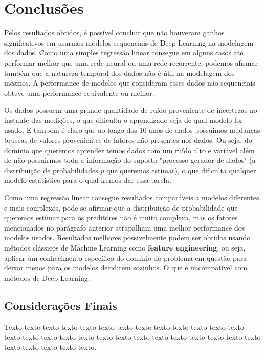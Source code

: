 \chapter{Conclusões}
\label{cap:conclusoes}


Pelos resultados obtidos, é possível concluir que não houveram ganhos significativos em usarmos modelos sequenciais de Deep Learning na modelagem dos dados. Como uma simples regressão linear consegue em alguns casos até performar melhor que uma rede neural ou uma rede recorrente, podemos afirmar também que a natureza temporal dos dados não é útil na modelagem dos mesmos. A performance de modelos que consideram esses dados não-sequenciais obteve uma performance equivalente ou melhor.

Os dados possuem uma grande quantidade de ruído proveniente de incertezas no instante das medições, o que dificulta o aprendizado seja de qual modelo for usado. E também é claro que ao longo dos 10 anos de dados possuimos mudanças bruscas de valores provenientes de fatores não presentes nos dados. Ou seja, do domínio que queremos aprender temos dados com um ruído alto e variável além de não possuirmos toda a informação do suposto "processo gerador de dados" (a distribuição de probabilidades $p$ que queremos estimar), o que dificulta qualquer modelo estatístico para o qual iremos dar essa tarefa.

Como uma regressão linear consegue resultados comparáveis a modelos diferentes e mais complexos, pode-se afirmar que a distribuição de probabilidade que queremos estimar para os preditores não é muito complexa, mas os fatores mencionados no parágrafo anterior atrapalham uma melhor performance dos modelos usados. Resultados melhores possivelmente podem ser obtidos usando métodos clássicos de Machine Learning como \textbf{feature engineering}, ou seja, aplicar um conhecimento específico do domínio do problema em questão para deixar menos para os modelos decidirem sozinhos. O que é imcompatível com métodos de Deep Learning. 




\section{Considerações Finais} 

Texto texto texto texto texto texto texto texto texto texto texto texto texto
texto texto texto texto texto texto texto texto texto texto texto texto texto
texto texto texto texto texto texto. 

